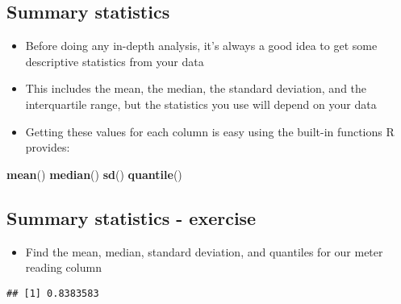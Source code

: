 \documentclass[]{article}
\newenvironment{Shaded}{\begin{snugshade}}{\end{snugshade}}
\newcommand{\KeywordTok}[1]{\textcolor[rgb]{0.13,0.29,0.53}{\textbf{#1}}}
\newcommand{\OperatorTok}[1]{\textcolor[rgb]{0.81,0.36,0.00}{\textbf{#1}}}
\newcommand{\NormalTok}[1]{#1}
\providecommand{\tightlist}{%
  \setlength{\itemsep}{0pt}\setlength{\parskip}{0pt}}
\begin{document}
\subsection{Summary statistics}\label{summary-statistics}

\begin{itemize}
\tightlist
\item
  Before doing any in-depth analysis, it's always a good idea to get
  some descriptive statistics from your data
\item
  This includes the mean, the median, the standard deviation, and the
  interquartile range, but the statistics you use will depend on your
  data
\item
  Getting these values for each column is easy using the built-in
  functions R provides:
\end{itemize}

\begin{Shaded}
\begin{Highlighting}[]
\KeywordTok{mean}\NormalTok{()}
\KeywordTok{median}\NormalTok{()}
\KeywordTok{sd}\NormalTok{()}
\KeywordTok{quantile}\NormalTok{()}
\end{Highlighting}
\end{Shaded}

\subsection{Summary statistics -
exercise}\label{summary-statistics---exercise}

\begin{itemize}
\tightlist
\item
  Find the mean, median, standard deviation, and quantiles for our meter
  reading column
\end{itemize}

\begin{Shaded}
\end{Shaded}

\begin{verbatim}
## [1] 0.8383583
\end{verbatim}

\begin{Shaded}
\end{Shaded}
\end{document}
